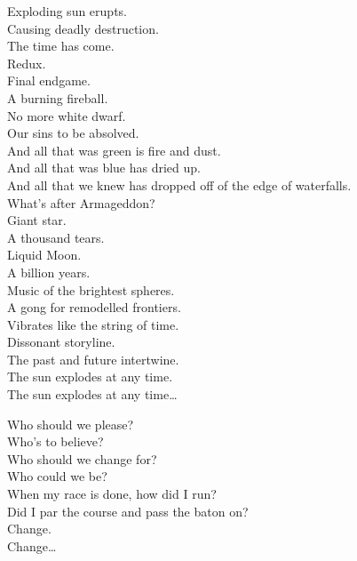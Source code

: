 Exploding sun erupts. \\
Causing deadly destruction. \\
The time has come. \\
Redux. \\
Final endgame. \\
A burning fireball. \\
No more white dwarf. \\
Our sins to be absolved. \\

And all that was green is fire and dust. \\
And all that was blue has dried up. \\
And all that we knew has dropped off of the edge of waterfalls. \\
What's after Armageddon? \\

Giant star. \\
A thousand tears. \\
Liquid Moon. \\
A billion years. \\
Music of the brightest spheres. \\
A gong for remodelled frontiers. \\
Vibrates like the string of time. \\
Dissonant storyline. \\
The past and future intertwine. \\
The sun explodes at any time. \\

The sun explodes at any time… \\




Who should we please? \\
Who's to believe? \\
Who should we change for? \\
Who could we be? \\
When my race is done, how did I run? \\
Did I par the course and pass the baton on? \\

Change. \\
Change… \\
